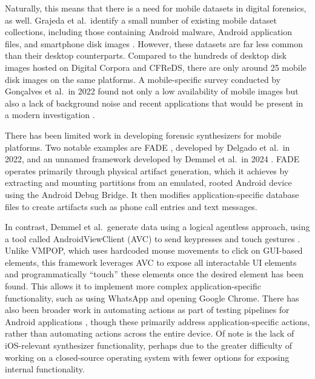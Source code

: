 \documentclass[letterpaper,12pt]{report}
\begin{document}
Naturally, this means that there is a need for mobile datasets in
digital forensics, as well. Grajeda et al.~identify a small number of
existing mobile dataset collections, including those containing Android
malware, Android application files, and smartphone disk images
\cite{grajedaAvailabilityDatasetsDigital2017}. However, these
datasets are far less common than their desktop counterparts. Compared
to the hundreds of desktop disk images hosted on Digital Corpora and
CFReDS, there are only around 25 mobile disk images on the same
platforms. A mobile-specific survey conducted by Gonçalves et al.~in
2022 found not only a low availability of mobile images but also a lack
of background noise and recent applications that would be present in a
modern investigation \cite{goncalvesRevisitingDatasetGap2022}.

There has been limited work in developing forensic synthesizers for
mobile platforms. Two notable examples are FADE
\cite{ceballosdelgadoFADEForensicImage2022}, developed by Delgado et
al.~in 2022, and an unnamed framework developed by Demmel et al.~in 2024
\cite{demmelDataSynthesisGoing2024}. FADE operates primarily through
physical artifact generation, which it achieves by extracting and
mounting partitions from an emulated, rooted Android device using the
Android Debug Bridge. It then modifies application-specific database
files to create artifacts such as phone call entries and text messages.

In contrast, Demmel et al.~generate data using a logical agentless
approach, using a tool called AndroidViewClient (AVC) to send keypresses
and touch gestures \cite{demmelDataSynthesisGoing2024}. Unlike
VMPOP, which uses hardcoded mouse movements to click on GUI-based
elements, this framework leverages AVC to expose all interactable UI
elements and programmatically ``touch'' these elements once the desired
element has been found. This allows it to implement more complex
application-specific functionality, such as using WhatsApp and opening
Google Chrome. There has also been broader work in automating actions as
part of testing pipelines for Android applications
\cite{janickiObstaclesOpportunitiesDeploying2012,nagowahNovelApproachAutomation2012,linares-vasquezHowDevelopersTest2017},
though these primarily address application-specific actions, rather than
automating actions across the entire device. Of note is the lack of
iOS-relevant synthesizer functionality, perhaps due to the greater
difficulty of working on a closed-source operating system with fewer
options for exposing internal functionality.
\end{document}
